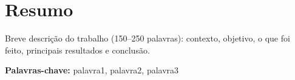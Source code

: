 \chapter*{Resumo}

Breve descrição do trabalho (150--250 palavras): contexto, objetivo, o que foi
feito, principais resultados e conclusão.

\vspace{1em}
\noindent\textbf{Palavras-chave:} palavra1, palavra2, palavra3
